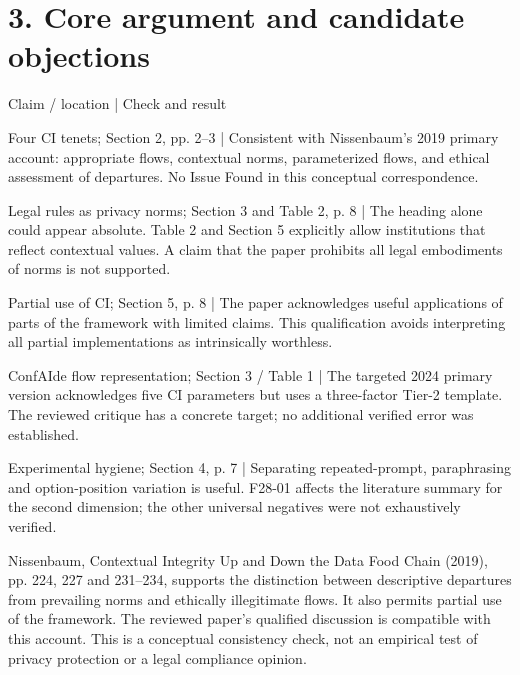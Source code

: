 \documentclass[10pt]{article}
\begin{document}
\section*{3. Core argument and candidate objections}
Claim / location | Check and result\par
Four CI tenets; Section 2, pp. 2–3 | Consistent with Nissenbaum’s 2019 primary account: appropriate flows, contextual norms, parameterized flows, and ethical assessment of departures. No Issue Found in this conceptual correspondence.\par
Legal rules as privacy norms; Section 3 and Table 2, p. 8 | The heading alone could appear absolute. Table 2 and Section 5 explicitly allow institutions that reflect contextual values. A claim that the paper prohibits all legal embodiments of norms is not supported.\par
Partial use of CI; Section 5, p. 8 | The paper acknowledges useful applications of parts of the framework with limited claims. This qualification avoids interpreting all partial implementations as intrinsically worthless.\par
ConfAIde flow representation; Section 3 / Table 1 | The targeted 2024 primary version acknowledges five CI parameters but uses a three-factor Tier-2 template. The reviewed critique has a concrete target; no additional verified error was established.\par
Experimental hygiene; Section 4, p. 7 | Separating repeated-prompt, paraphrasing and option-position variation is useful. F28-01 affects the literature summary for the second dimension; the other universal negatives were not exhaustively verified.\par
Nissenbaum, Contextual Integrity Up and Down the Data Food Chain (2019), pp. 224, 227 and 231–234, supports the distinction between descriptive departures from prevailing norms and ethically illegitimate flows. It also permits partial use of the framework. The reviewed paper’s qualified discussion is compatible with this account. This is a conceptual consistency check, not an empirical test of privacy protection or a legal compliance opinion.\par
\end{document}
